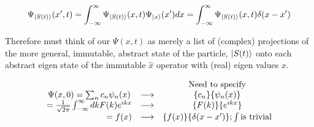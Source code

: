 \documentclass{article}
\begin{document}
$$\Psi_{\ket{S(t)}} (x',t) = \int_{- \infty}^\infty \Psi_{\ket{S(t)}} (x,t) \Psi_{\ket{x}} (x') dx = \int_{- \infty}^\infty \Psi_{\ket{S(t)}} (x,t) \delta(x - x')$$

Therefore must think of our $\Psi(x,t)$ as merely a list of (complex) projections of the more general, immutable, abstract state of the particle, $\ket{S(t)}$ onto each abstract eigen state of the immutable $\hat{x}$  operator with (real) eigen values $x$.


$$\begin{matrix}
& & \text{Need to specify} \\
\Psi(x,0) = \sum_n c_n \psi_n(x) & \longrightarrow &  \{c_n\} \{ \psi_n(x)\} \\
\hfill
= \frac{1}{\sqrt{2 \pi}} \int_{- \infty}^\infty dk F(k) e^{ikx} & \longrightarrow & \{F(k)\} \{e^{ikx}\} \\
\hfill
= f(x) & \longrightarrow & \{f(x)\} \{\delta(x-x')\}; \int \text{is trivial}
\end{matrix}$$
\end{document}
